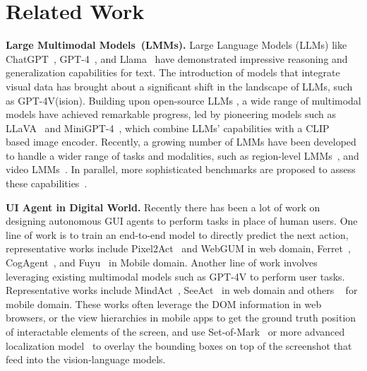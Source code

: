\section{Related Work}
\label{sec:related}

\textbf{Large Multimodal Models~(LMMs).} Large Language Models (LLMs) like ChatGPT~\citep{chatgpt}, GPT-4~\citep{gpt4}, and Llama~\citep{touvron2023llama} have demonstrated impressive reasoning and generalization capabilities for text. The introduction of models that integrate visual data has brought about a significant shift in the landscape of LLMs, such as GPT-4V(ision)\citep{GPT4V_System_Card}. Building upon open-source LLMs \citep{touvron2023llama,vicuna2023}, a wide range of multimodal models have achieved remarkable progress, led by pioneering models such as LLaVA~\citep{liu2023llava, liu2023improvedllava} and MiniGPT-4~\citep{zhu2023minigpt}, which combine LLMs' capabilities with a CLIP~\citep{radford2021learning} based image encoder. Recently,  a growing number of LMMs have been developed to handle a wider range of tasks and modalities, such as region-level LMMs~\citep{cai2024vipllava, zhang2023gpt4roi, chen2023shikra, peng2023kosmos,zhang2023llavagrounding}, and video LMMs~\citep{lin2023video, zhang2023video, zhang2024llavanextvideo,tan2024koala}. In parallel, more sophisticated benchmarks are proposed to assess these capabilities~\cite{fu2024videommefirstevercomprehensiveevaluation,fu2024blink,cai2024temporalbenchbenchmarkingfinegrainedtemporal}. 

\noindent\textbf{UI Agent in Digital World.} Recently there has been a lot of work on designing autonomous GUI agents to perform tasks in place of human users. One line of work is to train an end-to-end model to directly predict the next action, representative works include Pixel2Act~\cite{pixel2act} and WebGUM\cite{webgum} in web domain, Ferret~\cite{ferretui}, CogAgent~\cite{cogagent}, and Fuyu~\cite{fuyu_8b} in Mobile domain. Another line of work involves leveraging existing multimodal models such as GPT-4V to perform user tasks. Representative works include MindAct~\cite{mind2web}, SeeAct~\cite{zheng2024gpt4vision} in web domain and others ~\cite{gpt4v_wonderland, mobile_agent, aitw} for mobile domain. 
These works often leverage the DOM information in web browsers, or the view hierarchies in mobile apps to get the ground truth position of interactable elements of the screen, and use Set-of-Mark~\cite{setofmark} or more advanced localization model~\cite{lu2024omniparser} to overlay the bounding boxes on top of the screenshot that feed into the vision-language models. 

